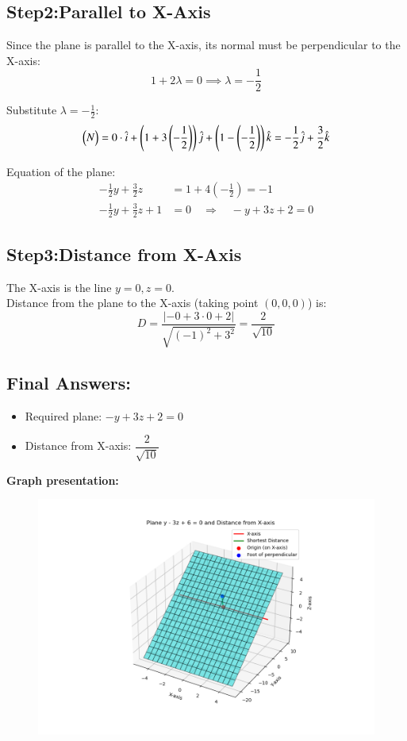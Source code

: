\documentclass[journal]{IEEEtran}
\begin{document}
\subsection*{Step2:Parallel to X-Axis}

Since the plane is parallel to the X-axis, its normal must be perpendicular to the X-axis:
\begin{equation}
1 + 2\lambda = 0 \implies \lambda = -\frac{1}{2}
\label{eq:lambda}
\end{equation}

Substitute $\lambda = -\frac{1}{2}$:
\begin{equation}
\begin{pmatrix}N\end{pmatrix} = 0 \cdot \hat{i} + \left(1 + 3\left(-\frac{1}{2}\right)\right)\hat{j} + \left(1 - \left(-\frac{1}{2}\right)\right)\hat{k} 
= -\frac{1}{2}\hat{j} + \frac{3}{2}\hat{k}
\label{eq:normal_final}
\end{equation}

Equation of the plane:
\begin{align}
-\frac{1}{2}y + \frac{3}{2}z &= 1 + 4\left(-\frac{1}{2}\right) = -1 \label{eq:plane_eq1} \\
-\frac{1}{2}y + \frac{3}{2}z + 1 &= 0 \quad \Rightarrow \quad -y + 3z + 2 = 0 \label{eq:plane_eq2}
\end{align}

\subsection*{Step3:Distance from X-Axis}

The X-axis is the line $y=0, z=0$.\\
Distance from the plane to the X-axis (taking point $(0,0,0)$) is:
\begin{equation}
D = \frac{| -0 + 3 \cdot 0 + 2 |}{\sqrt{(-1)^2 + 3^2}} = \frac{2}{\sqrt{10}}
\label{eq:distance}
\end{equation}

\subsection*{Final Answers:}

\begin{itemize}
    \item Required plane: $-y + 3z + 2 = 0$ 
    \item Distance from X-axis: $\dfrac{2}{\sqrt{10}}$
\end{itemize}


\textbf{Graph presentation:}
\begin{figure}[H]
\begin{center}
\includegraphics[width=0.6\columnwidth]{figs/fig8.png}
\end{center}
\caption{}
\label{fig:Fig}
\end{figure}
\end{document}
